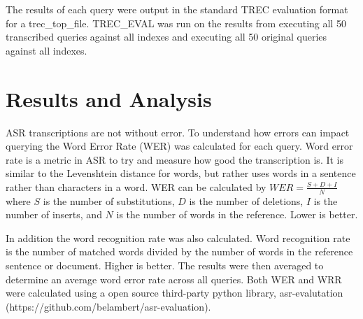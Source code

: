 \documentclass[jair, twoside,11pt,theapa]{article}
\begin{document}
The results of each query were output in the standard TREC evaluation format for a trec\_top\_file. TREC\_EVAL was run on the results from executing all 50 transcribed queries against all indexes and executing all 50 original queries against all indexes. 


\section{Results and Analysis}
\label{Results}

ASR transcriptions are not without error. To understand how errors can impact querying the Word Error Rate (WER) was calculated for each query. Word error rate is a metric in ASR to try and measure how good the transcription is. It is similar to the Levenshtein distance for words, but rather uses words in a sentence rather than characters in a word. WER can be calculated by $WER = \frac{S + D + I}{N}$ where $S$ is the number of substitutions, $D$ is the number of deletions, $I$ is the number of inserts, and $N$ is the number of words in the reference. Lower is better. 

In addition the word recognition rate was also calculated. Word recognition rate is the number of matched words divided by the number of words in the reference sentence or document. Higher is better. The results were then averaged to determine an average word error rate across all queries. Both WER and WRR were calculated using a open source third-party python library, asr-evalutation (https://github.com/belambert/asr-evaluation).
\end{document}
